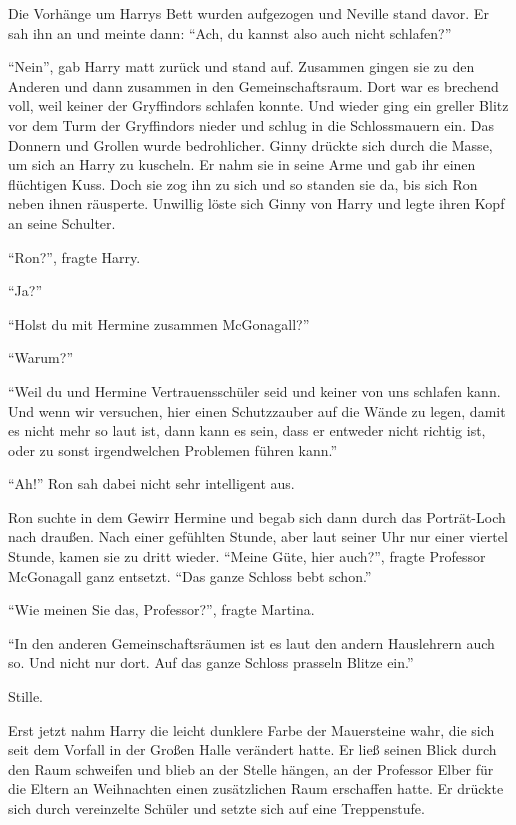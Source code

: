 Die Vorhänge um Harrys Bett wurden aufgezogen und Neville stand davor. Er sah ihn an und meinte dann: \enquote{Ach, du kannst also auch nicht schlafen?}

\enquote{Nein}, gab Harry matt zurück und stand auf. Zusammen gingen sie zu den Anderen und dann zusammen in den Gemeinschaftsraum. Dort war es brechend voll, weil keiner der Gryffindors schlafen konnte. Und wieder ging ein greller Blitz vor dem Turm der Gryffindors nieder und schlug in die Schlossmauern ein. Das Donnern und Grollen wurde bedrohlicher.  Ginny drückte sich durch die Masse, um sich an Harry zu kuscheln. Er nahm sie in seine Arme und gab ihr einen flüchtigen Kuss. Doch sie zog ihn zu sich und so standen sie da, bis sich Ron neben ihnen räusperte. Unwillig löste sich Ginny von Harry und legte ihren Kopf an seine Schulter.

\enquote{Ron?}, fragte Harry.

\enquote{Ja?}

\enquote{Holst du mit Hermine zusammen McGonagall?}

\enquote{Warum?}

\enquote{Weil du und Hermine Vertrauensschüler seid und keiner von uns schlafen kann. Und wenn wir versuchen, hier einen Schutzzauber auf die Wände zu legen, damit es nicht mehr so laut ist, dann kann es sein, dass er entweder nicht richtig ist, oder zu sonst irgendwelchen Problemen führen kann.}

\enquote{Ah!} Ron sah dabei nicht sehr intelligent aus.

Ron suchte in dem Gewirr Hermine und begab sich dann durch das Porträt-Loch nach draußen. Nach einer gefühlten Stunde, aber laut seiner Uhr nur einer viertel Stunde, kamen sie zu dritt wieder. \enquote{Meine Güte, hier auch?}, fragte Professor McGonagall ganz entsetzt. \enquote{Das ganze Schloss bebt schon.}

\enquote{Wie meinen Sie das, Professor?}, fragte Martina.

\enquote{In den anderen Gemeinschaftsräumen ist es laut den andern Hauslehrern auch so. Und nicht nur dort. Auf das ganze Schloss prasseln Blitze ein.}

Stille.

Erst jetzt nahm Harry die leicht dunklere Farbe der Mauersteine wahr, die sich seit dem Vorfall in der Großen Halle verändert hatte. Er ließ seinen Blick durch den Raum schweifen und blieb an der Stelle hängen, an der Professor Elber für die Eltern an Weihnachten einen zusätzlichen Raum erschaffen hatte. Er drückte sich durch vereinzelte Schüler und setzte sich auf eine Treppenstufe.

